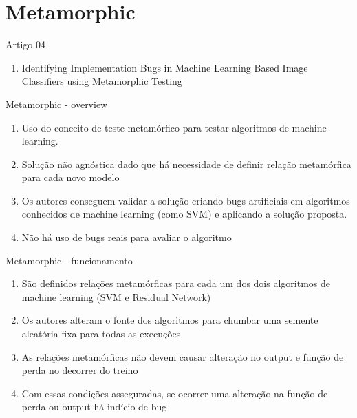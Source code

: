 \section{Metamorphic}

\begin{frame}
	\begin{block}{Artigo 04}
	\begin{enumerate}
		\item Identifying Implementation Bugs in Machine Learning Based Image Classifiers using Metamorphic Testing
	\end{enumerate}
	\end{block}
\end{frame}

\begin{frame}
	\begin{block}{Metamorphic - overview}
	\begin{enumerate}
		\item Uso do conceito de teste metamórfico para testar algoritmos de machine learning.
		\item Solução não agnóstica dado que há necessidade de definir relação metamórfica para cada novo modelo
		\item Os autores conseguem validar a solução criando bugs artificiais em algoritmos conhecidos de machine learning (como SVM) e aplicando a solução proposta.
		\item Não há uso de bugs reais para avaliar o algoritmo
	\end{enumerate}
	\end{block}
\end{frame}

\begin{frame}
	\begin{block}{Metamorphic - funcionamento}
		\begin{enumerate}
			\item São definidos relações metamórficas para cada um dos dois algoritmos de machine learning (SVM e Residual Network)
			\item Os autores alteram o fonte dos algoritmos para chumbar uma semente aleatória fixa para todas as execuções
			\item As relações metamórficas não devem causar alteração no output e  função de perda no decorrer do treino
			\item Com essas condições asseguradas, se ocorrer uma alteração na função de perda ou output há indício de bug
		\end{enumerate}
	\end{block}
\end{frame}


